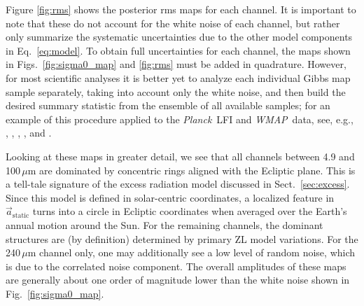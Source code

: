 \documentclass{aa}
\def\Planck{\textit{Planck}}
\def\WMAP{\textit{WMAP}}
\renewcommand{\a}[0]{\vec{a}}
\newcommand{\cosmoglobe}{\textsc{Cosmoglobe}}
\begin{document}
Figure \ref{fig:rms} shows the posterior rms maps for each channel. It
is important to note that these do not account for the white noise of
each channel, but rather only summarize the systematic uncertainties
due to the other model components in Eq.~\eqref{eq:model}. To obtain
full uncertainties for each channel, the maps shown in
Figs.~\ref{fig:sigma0_map} and \ref{fig:rms} must be added in
quadrature. However, for most scientific analyses it is better yet to
analyze each individual Gibbs map sample separately, taking into
account only the white noise, and then build the desired summary
statistic from the ensemble of all available samples; for an example of
this procedure applied to the \Planck\ LFI and \WMAP\ data, see, e.g.,
\citet{bp10}, \citet{bp11}, \citet{bp12}, \citet{bp13}, and \citet{watts2023_dr1}.

Looking at these maps in greater detail, we see that all channels
between 4.9 and 100$\,\mu$m are dominated by concentric rings aligned
with the Ecliptic plane. This is a tell-tale signature of the excess
radiation model discussed in Sect.~\ref{sec:excess}. Since this model
is defined in solar-centric coordinates, a localized feature in
$\a_{\mathrm{static}}$ turns into a circle in Ecliptic coordinates
when averaged over the Earth's annual motion around the Sun. For the
remaining channels, the dominant structures are (by definition)
determined by primary ZL model variations. For the 240\,$\mu$m
channel only, one may additionally see a low level of random noise,
which is due to the correlated noise component. The overall amplitudes
of these maps are generally about one order of magnitude lower than
the white noise shown in Fig.~\ref{fig:sigma0_map}.


\end{document}
